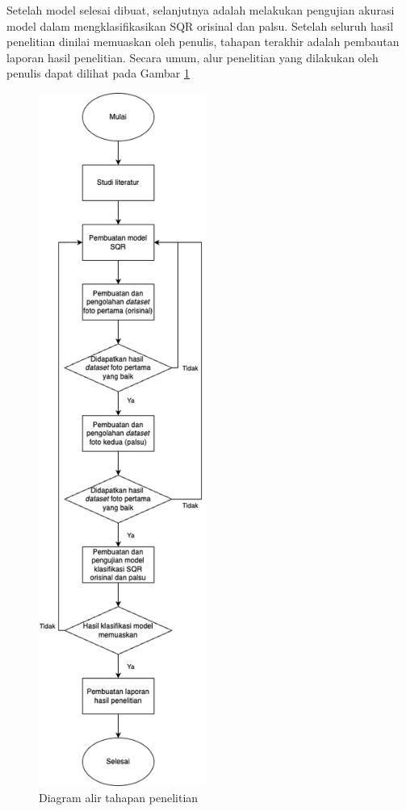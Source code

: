 Setelah model selesai dibuat, selanjutnya adalah melakukan pengujian akurasi model dalam mengklasifikasikan SQR orisinal dan palsu. Setelah seluruh hasil
penelitian dinilai memuaskan oleh penulis, tahapan terakhir adalah pembautan laporan hasil penelitian. Secara umum, alur penelitian yang dilakukan oleh penulis
dapat dilihat pada Gambar \ref{Fig: 3-diagramalirpenelitian}

\clearpage

\begin{figure}[h]
	\centering
	\includegraphics[width=5.5cm]{contents/chapter-3/3-garisbesaralurpenelitian.png}
	\caption{Diagram alir tahapan penelitian}
	\label{Fig: 3-diagramalirpenelitian}
\end{figure}

